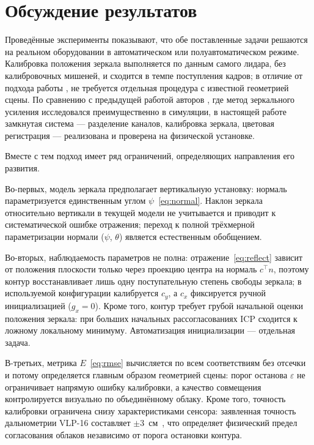 \documentclass{misisarticle}
\begin{document}
\section{Обсуждение результатов}

Проведённые эксперименты показывают, что обе поставленные задачи
решаются на реальном оборудовании в автоматическом или
полуавтоматическом режиме. Калибровка положения зеркала выполняется по
данным самого лидара, без калибровочных мишеней, и сходится в темпе
поступления кадров; в отличие от подхода работы
\cite{Kibii2022MirrorCalibration}, не требуется отдельная процедура с
известной геометрией сцены. По сравнению с предыдущей работой авторов
\cite{VisFed26}, где метод зеркального усиления
исследовался преимущественно в симуляции, в настоящей работе замкнутая
система --- разделение каналов, калибровка зеркала, цветовая
регистрация --- реализована и проверена на физической установке.

Вместе с тем подход имеет ряд ограничений, определяющих направления
его развития.

Во-первых, модель зеркала предполагает вертикальную установку: нормаль
параметризуется единственным углом $\psi$~\eqref{eq:normal}. Наклон
зеркала относительно вертикали в текущей модели не учитывается и
приводит к систематической ошибке отражения; переход к полной
трёхмерной параметризации нормали ($\psi$, $\theta$) является
естественным обобщением.

Во-вторых, наблюдаемость параметров не полна: отражение~\eqref{eq:reflect}
зависит от положения плоскости только через проекцию центра на нормаль
$c^{\top} n$, поэтому контур восстанавливает лишь одну поступательную
степень свободы зеркала; в используемой конфигурации калибруется $c_y$,
а $c_x$ фиксируется ручной инициализацией ($g_x = 0$). Кроме того,
контур требует грубой начальной оценки положения зеркала: при больших
начальных рассогласованиях ICP сходится к ложному локальному минимуму.
Автоматизация инициализации --- отдельная задача.

В-третьих, метрика $E$~\eqref{eq:rmse} вычисляется по всем
соответствиям без отсечки и потому определяется главным образом
геометрией сцены: порог останова $\varepsilon$ не ограничивает
напрямую ошибку калибровки, а качество совмещения контролируется
визуально по объединённому облаку. Кроме того, точность калибровки
ограничена снизу характеристиками сенсора: заявленная точность
дальнометрии VLP-16 составляет $\pm 3$~см~\cite{VLP16Manual}, что
определяет физический предел согласования облаков независимо от
порога остановки контура.
\end{document}
